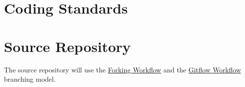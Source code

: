 \documentclass[a4paper]{report}
\numberwithin{equation}{chapter}
\begin{document}
\section[Coding Standards]{Coding Standards}

\section[Source Repository]{Source Repository}

The source repository will use the \href{https://www.atlassian.com/git/tutorials/comparing-workflows/forking-workflow}{Forking Workflow} and the \href{https://www.atlassian.com/git/tutorials/comparing-workflows/gitflow-workflow}{Gitflow Workflow} branching model.
\end{document}
